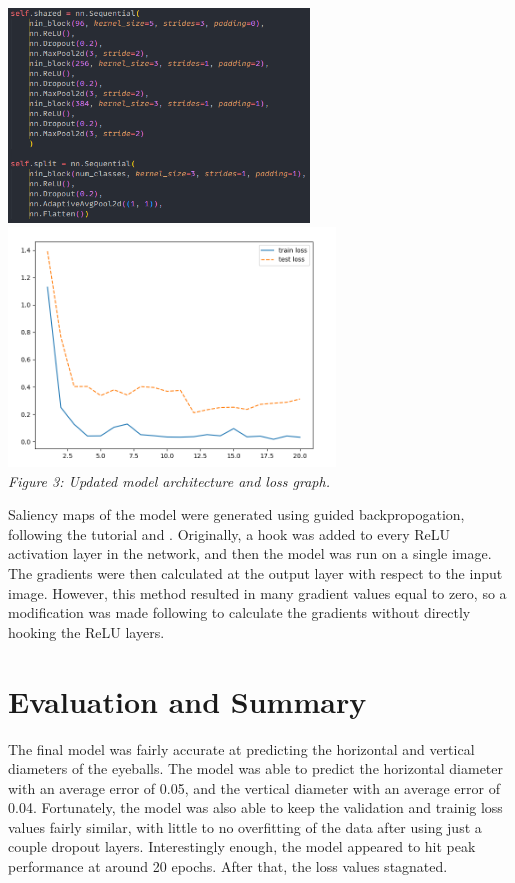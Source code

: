 \documentclass{article}[12pt]
\begin{document}
\begin{center}
    \includegraphics[width=0.6\textwidth]{images/final_model.png}\\
    \includegraphics[width=0.65\textwidth]{images/final_model_graph.png}\\
    \textit{Figure 3: Updated model architecture and loss graph.}
\end{center}

Saliency maps of the model were generated using guided backpropogation, following the tutorial \cite{saliency} and \cite{backprop}. Originally, a hook was added to every ReLU activation layer in the network, and then the model was run on a single image. The gradients were then calculated at the output layer with respect to the input image. However, this method resulted in many gradient values equal to zero, so a modification was made following \cite{saliency} to calculate the gradients without directly hooking the ReLU layers.\\

\section*{Evaluation and Summary}

The final model was fairly accurate at predicting the horizontal and vertical diameters of the eyeballs. The model was able to predict the horizontal diameter with an average error of 0.05, and the vertical diameter with an average error of 0.04. Fortunately, the model was also able to keep the validation and trainig loss values fairly similar, with little to no overfitting of the data after using just a couple dropout layers. Interestingly enough, the model appeared to hit peak performance at around 20 epochs. After that, the loss values stagnated.\\
\end{document}
